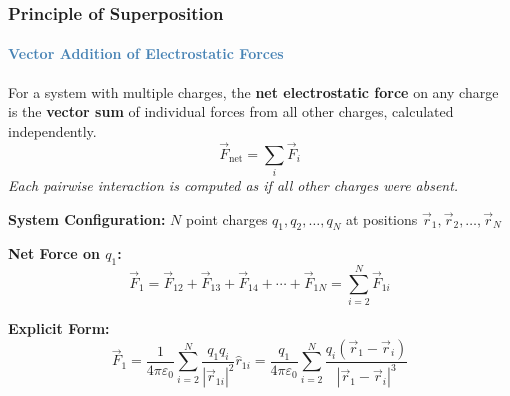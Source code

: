 \begin{frame}
\frametitle{\textsf{\textbf{Principle of Superposition}}}
\framesubtitle{\textcolor{steelblue}{Vector Addition of Electrostatic Forces}}

\vspace{-0.05cm}

\begin{keybox}
\vspace{0.1cm}
For a system with multiple charges, the \textbf{net electrostatic force} on any charge is the \textbf{vector sum} of individual forces from all other charges, calculated independently.
\begin{equation*}
\boxed{\vec{F}_{\text{net}} = \sum_{i} \vec{F}_i}
\end{equation*}
\textit{Each pairwise interaction is computed as if all other charges were absent.}
\vspace{0.05cm}
\end{keybox}

\vspace{0.25cm}

\begin{examplebox}
\vspace{0.15cm}

\textbf{System Configuration:} $N$ point charges $q_1, q_2, \ldots, q_N$ at positions $\vec{r}_1, \vec{r}_2, \ldots, \vec{r}_N$

\vspace{0.2cm}

\textbf{Net Force on $q_1$:}
\begin{equation*}
\vec{F}_1 = \vec{F}_{12} + \vec{F}_{13} + \vec{F}_{14} + \cdots + \vec{F}_{1N} = \sum_{i=2}^{N} \vec{F}_{1i}
\end{equation*}

\vspace{0.2cm}

\textbf{Explicit Form:}
\begin{equation*}
\boxed{\vec{F}_1 = \frac{1}{4\pi\varepsilon_0} \sum_{i=2}^{N} \frac{q_1 q_i}{|\vec{r}_{1i}|^2} \hat{r}_{1i} = \frac{q_1}{4\pi\varepsilon_0} \sum_{i=2}^{N} \frac{q_i (\vec{r}_1 - \vec{r}_i)}{|\vec{r}_1 - \vec{r}_i|^3}}
\end{equation*}


\end{examplebox}
\end{frame}
